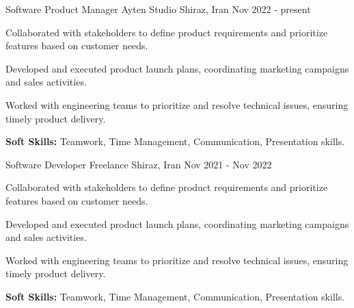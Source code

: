 

\begin{cventries}

  \cventry
    {Software Product Manager} %
    {Ayten Studio} %
    {Shiraz, Iran} %
    {Nov 2022 - present} %
    {
      \begin{cvitems} %
        \item {Collaborated with stakeholders to define product requirements and prioritize features based on customer needs.}
        \item {Developed and executed product launch plans, coordinating marketing campaigns and sales activities.}
        \item {Worked with engineering teams to prioritize and resolve technical issues, ensuring timely product delivery.}
        \item {\textbf{Soft Skills:} Teamwork, Time Management, Communication, Presentation skills.}
      \end{cvitems}
    }
    \cventry
    {Software Developer} %
    {Freelance} %
    {Shiraz, Iran} %
    {Nov 2021 - Nov 2022} %
    {
      \begin{cvitems} %
        \item {Collaborated with stakeholders to define product requirements and prioritize features based on customer needs.}
        \item {Developed and executed product launch plans, coordinating marketing campaigns and sales activities.}
        \item {Worked with engineering teams to prioritize and resolve technical issues, ensuring timely product delivery.}
        \item {\textbf{Soft Skills:} Teamwork, Time Management, Communication, Presentation skills.}
      \end{cvitems}
    }

\end{cventries}
